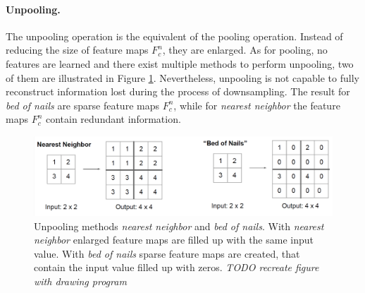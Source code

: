 \paragraph{Unpooling.}
The unpooling operation is the equivalent of the pooling operation.
Instead of reducing the size of feature maps $F^{n}_{c}$, they are enlarged.
As for pooling, no features are learned and there exist multiple methods to perform unpooling, two of them are illustrated in Figure \ref{fig:ch2:sec2:unpooling_1}.
Nevertheless, unpooling is not capable to fully reconstruct information lost during the process of downsampling.
The result for \textit{bed of nails} are sparse feature maps $F^{n}_{c}$, while for \textit{nearest neighbor} the feature maps $F^{n}_{c}$ contain redundant information.

\begin{figure}
	\includegraphics[width=\linewidth]{figures/chap223_unpooling1.png}
	\caption[Unpooling methods \textit{nearest neighbor} and \textit{bed of nails}]{
		Unpooling methods \textit{nearest neighbor} and \textit{bed of nails}.
		With \textit{nearest neighbor} enlarged feature maps are filled up with the same input value. 
		With \textit{bed of nails} sparse feature maps are created, that contain the input value filled up with zeros.
		\textit{TODO recreate figure with drawing program}}	
	\label{fig:ch2:sec2:unpooling_1}
\end{figure}


